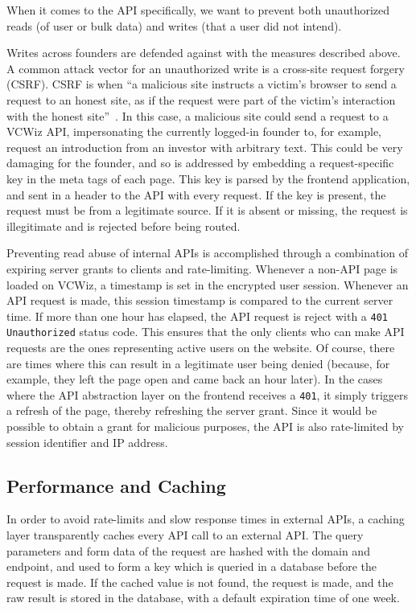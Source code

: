 When it comes to the API specifically, we want to prevent both unauthorized reads (of user or bulk data) and writes (that a user did not intend).

Writes across founders are defended against with the measures described above. A common attack vector for an unauthorized write is a cross-site request forgery (CSRF). CSRF is when ``a malicious site instructs a victim's browser to send a request to an honest site, as if the request were part of the victim's interaction with the honest site''~\cite{Barth:2008:RDC:1455770.1455782}. In this case, a malicious site could send a request to a VCWiz API, impersonating the currently logged-in founder to, for example, request an introduction from an investor with arbitrary text. This could be very damaging for the founder, and so is addressed by embedding a request-specific key in the meta tags of each page. This key is parsed by the frontend application, and sent in a header to the API with every request. If the key is present, the request must be from a legitimate source. If it is absent or missing, the request is illegitimate and is rejected before being routed.

Preventing read abuse of internal APIs is accomplished through a combination of expiring server grants to clients and rate-limiting. Whenever a non-API page is loaded on VCWiz, a timestamp is set in the encrypted user session. Whenever an API request is made, this session timestamp is compared to the current server time. If more than one hour has elapsed, the API request is reject with a \texttt{401 Unauthorized} status code. This ensures that the only clients who can make API requests are the ones representing active users on the website. Of course, there are times where this can result in a legitimate user being denied (because, for example, they left the page open and came back an hour later). In the cases where the API abstraction layer on the frontend receives a \texttt{401}, it simply triggers a refresh of the page, thereby refreshing the server grant. Since it would be possible to obtain a grant for malicious purposes, the API is also rate-limited by session identifier and IP address.

\subsection{Performance and Caching}

In order to avoid rate-limits and slow response times in external APIs, a caching layer transparently caches every API call to an external API. The query parameters and form data of the request are hashed with the domain and endpoint, and used to form a key which is queried in a database before the request is made. If the cached value is not found, the request is made, and the raw result is stored in the database, with a default expiration time of one week.

